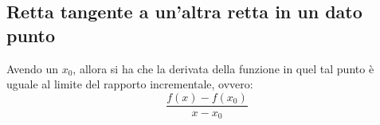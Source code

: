 \documentclass[12pt]{article}
\begin{document}
\subsection{Retta tangente a un'altra retta in un dato punto}
Avendo un $x_0$, allora si ha che la derivata della funzione in quel tal punto è uguale al limite del rapporto incrementale, ovvero:
\begin{equation}
    \dfrac{f(x) - f(x_0)}{x - x_0} \label{eq:rapporto_incrementale}
\end{equation}
\end{document}
